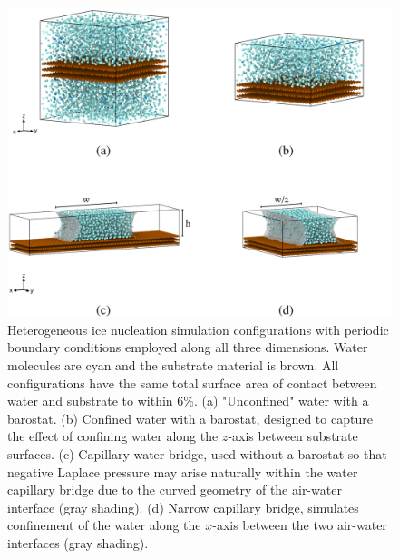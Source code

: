 \documentclass[journal abbreviation, manuscript]{copernicus}
\begin{document}
\begin{figure}[t]
\includegraphics[width=12cm]{figures/configurations.png}
\caption{\label{fig:configurations} Heterogeneous ice nucleation simulation configurations with periodic boundary conditions employed along all three dimensions. Water molecules are cyan and the substrate material is brown. All configurations have the same total surface area of contact between water and substrate to within 6\%. (a) "Unconfined" water with a barostat. (b) Confined water with a barostat, designed to capture the effect of confining water along the $z$-axis between substrate surfaces. (c) Capillary water bridge, used without a barostat so that negative Laplace pressure may arise naturally within the water capillary bridge due to the curved geometry of the air-water interface (gray shading). (d) Narrow capillary bridge, simulates confinement of the water along the $x$-axis between the two air-water interfaces (gray shading).}
\end{figure}
\end{document}
